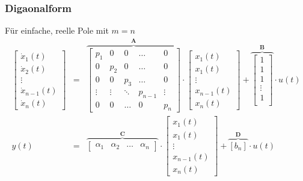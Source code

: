 \subsubsection{Digaonalform }
\begin{multicols}{2}
  Für einfache, reelle Pole mit $m=n$ \\
  \scriptsize 
    \begin{eqnarray*}
      \begin{bmatrix}
        \dot{x}_1(t) \\
        \dot{x}_2(t) \\
        \vdots \\
        \dot{x}_{n-1}(t) \\
        \dot{x}_n(t)
      \end{bmatrix} &=& \overbrace{ \begin{bmatrix}
        p_1 & 0 & 0 & \ldots & 0 \\
        0 & p_2 & 0 & \ldots & 0 \\
        0 & 0 & p_3 & \ldots & 0 \\
        \vdots & \vdots & \ddots & p_{n-1} & \vdots \\
        0 & 0 & \ldots & 0 & p_n
      \end{bmatrix}}^{\mathbf A} \cdot \begin{bmatrix}
        x_1(t) \\
        x_1(t) \\
        \vdots \\
        x_{n-1}(t) \\
        x_n(t)
      \end{bmatrix} + \overbrace{\begin{bmatrix}
        1 \\
        1 \\
        1 \\
        \vdots \\
        1 \\
      \end{bmatrix}}^{\mathbf{B}} \cdot u(t) \\
      y(t) &=& \overbrace{\begin{bmatrix}
        \alpha_1 & \alpha_2 & \ldots & \alpha_n
      \end{bmatrix}}^{\mathbf{C}} \cdot \begin{bmatrix}
        x_1(t) \\
        x_1(t) \\
        \vdots \\
        x_{n-1}(t) \\
        x_n(t)
      \end{bmatrix} + \overbrace{[b_n]}^{\mathbf{D}} \cdot u(t)
    \end{eqnarray*}
  \normalsize


\end{multicols}
